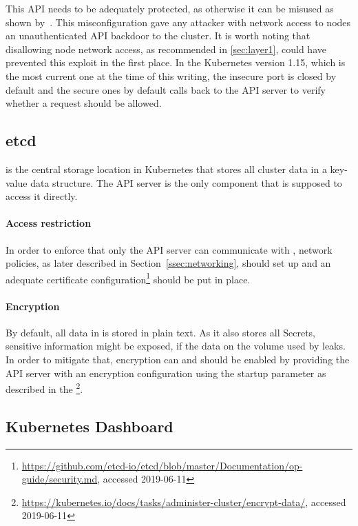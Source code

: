 This API needs to be adequately protected, as otherwise it can be misused as shown by~\textcite{kubeletBackdoor}. This misconfiguration gave any attacker with network access to nodes an unauthenticated API backdoor to the cluster. It is worth noting that disallowing node network access, as recommended in \ref{sec:layer1}, could have prevented this exploit in the first place. In the Kubernetes version 1.15, which is the most current one at the time of this writing, the insecure port is closed by default and the secure ones by default calls back to the API server to verify whether a request should be allowed. 

\subsection{etcd}

 is the central storage location in Kubernetes that stores all cluster data in a key-value data structure. The API server is the only component that is supposed to access it directly.

\paragraph{Access restriction}
In order to enforce that only the API server can communicate with , network policies, as later described in Section~\ref{ssec:networking}, should set up and an adequate certificate configuration\footnote{\url{https://github.com/etcd-io/etcd/blob/master/Documentation/op-guide/security.md}, accessed 2019-06-11} should be put in place.

\paragraph{Encryption}
By default, all data in  is stored in plain text. As it also stores all Secrets, sensitive information might be exposed, if the data on the volume used by  leaks. In order to mitigate that, encryption can and should be enabled by providing the API server with an encryption configuration using the startup parameter  as described in the \textcite{k8sdocs}\footnote{\url{https://kubernetes.io/docs/tasks/administer-cluster/encrypt-data/}, accessed 2019-06-11}. %


\subsection{Kubernetes Dashboard}

